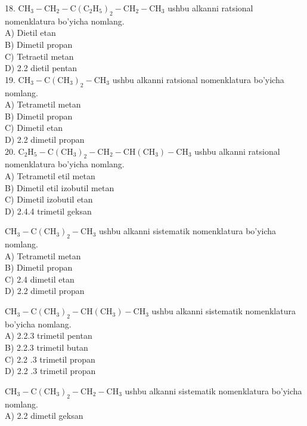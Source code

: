 18. $\mathrm{CH}_{3}-\mathrm{CH}_{2}-\mathrm{C}\left(\mathrm{C}_{2} \mathrm{H}_{5}\right)_{2}-\mathrm{CH}_{2}-\mathrm{CH}_{3}$ ushbu alkanni ratsional nomenklatura bo'yicha nomlang.\\
A) Dietil etan\\
B) Dimetil propan\\
C) Tetraetil metan\\
D) 2.2 dietil pentan\\
19. $\mathrm{CH}_{3}-\mathrm{C}\left(\mathrm{CH}_{3}\right)_{2}-\mathrm{CH}_{3}$ ushbu alkanni ratsional nomenklatura bo'yicha nomlang.\\
A) Tetrametil metan\\
B) Dimetil propan\\
C) Dimetil etan\\
D) 2.2 dimetil propan\\
20. $\mathrm{C}_{2} \mathrm{H}_{5}-\mathrm{C}\left(\mathrm{CH}_{3}\right)_{2}-\mathrm{CH}_{2}-\mathrm{CH}\left(\mathrm{CH}_{3}\right)-\mathrm{CH}_{3}$ ushbu alkanni ratsional nomenklatura bo'yicha nomlang.\\
A) Tetrametil etil metan\\
B) Dimetil etil izobutil metan\\
C) Dimetil izobutil etan\\
D) 2.4.4 trimetil geksan
  \item $\mathrm{CH}_{3}-\mathrm{C}\left(\mathrm{CH}_{3}\right)_{2}-\mathrm{CH}_{3}$ ushbu alkanni sistematik nomenklatura bo'yicha nomlang.\\
A) Tetrametil metan\\
B) Dimetil propan\\
C) 2.4 dimetil etan\\
D) 2.2 dimetil propan\\
  \item $\mathrm{CH}_{3}-\mathrm{C}\left(\mathrm{CH}_{3}\right)_{2}-\mathrm{CH}\left(\mathrm{CH}_{3}\right)-\mathrm{CH}_{3}$ ushbu alkanni sistematik nomenklatura bo'yicha nomlang.\\
A) 2.2.3 trimetil pentan\\
B) 2.2.3 trimetil butan\\
C) 2.2 .3 trimetil propan\\
D) 2.2 .3 trimetil propan
  \item $\mathrm{CH}_{3}-\mathrm{C}\left(\mathrm{CH}_{3}\right)_{2}-\mathrm{CH}_{2}-\mathrm{CH}_{3}$ ushbu alkanni sistematik nomenklatura bo'yicha nomlang.\\
A) 2.2 dimetil geksan\\
